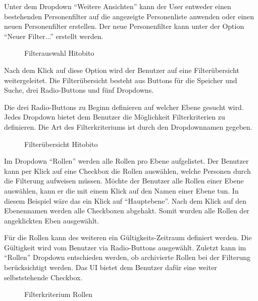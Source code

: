 Unter dem Dropdown ``Weitere Ansichten'' kann der User entweder einen bestehenden Personenfilter auf die angezeigte Personenliste anwenden 
oder einen neuen Personenfilter erstellen. Der neue Personenfilter kann unter der Option ``Neuer Filter...'' erstellt werden.

\begin{figure}[h]
   \centering
   \caption{Filterauswahl Hitobito}
\end{figure}

\newpage

Nach dem Klick auf diese Option wird der Benutzer auf eine Filterübersicht weitergeleitet. Die Filterübersicht besteht aus Buttons für die Speicher und Suche, drei Radio-Buttons und fünf Dropdowns.

Die drei Radio-Buttons zu Beginn definieren auf welcher Ebene gesucht wird.
Jedes Dropdown bietet dem Benutzer die Möglichkeit Filterkriterien zu definieren. Die Art des Filterkriteriums ist durch
den Dropdownnamen gegeben.


\begin{figure}[h]
   \centering
   \caption{Filterübersicht Hitobito}
\end{figure}

\newpage

Im Dropdown ``Rollen'' werden alle Rollen pro Ebene aufgelistet. Der Benutzer kann per Klick auf eine Checkbox
die Rollen auswählen, welche Personen durch die Filterung aufweisen müssen. Möchte der Benutzer alle Rollen einer Ebene auswählen,
kann er die mit einem Klick auf den Namen einer Ebene tun. In diesem Beispiel wäre das ein Klick auf ``Hauptebene''. Nach dem Klick auf den
Ebenennamen werden alle Checkboxen abgehakt. Somit wurden alle Rollen der angeklickten Eben ausgewählt.

Für die Rollen kann des weiteren ein Gültigkeits-Zeitraum definiert werden. Die Gültigkeit
wird vom Benutzer via Radio-Buttons ausgewählt. Zuletzt kann im ``Rollen'' Dropdown entschieden werden, ob 
archivierte Rollen bei der Filterung berücksichtigt werden. Das UI bietet dem Benutzer dafür eine weiter selbststehende
Checkbox.

\begin{figure}[h]
   \centering
   \caption{Filterkriterium Rollen}
\end{figure}

